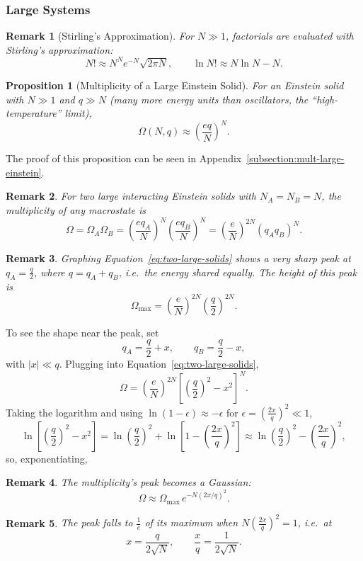 \documentclass{article}
\newtheorem{remark}{Remark}
\newtheorem{proposition}{Proposition}
\begin{document}
\subsubsection{Large Systems}
\begin{remark}[Stirling's Approximation]
    For $N \gg 1$, factorials are evaluated with Stirling's approximation:
    \begin{equation}
        \label{eq:stirling-approx}
        N! \approx N^N e^{-N}\sqrt{2\pi N}, \qquad \ln N! \approx N\ln N - N.
    \end{equation}
\end{remark}
\begin{proposition}[Multiplicity of a Large Einstein Solid]
    For an Einstein solid with $N \gg 1$ and $q \gg N$ (many more energy units than oscillators, the ``high-temperature'' limit),
    \begin{equation}
        \label{eq:einstein-high-T}
        \Omega(N, q) \approx \left(\frac{eq}{N}\right)^N.
    \end{equation}
\end{proposition}
The proof of this proposition can be seen in Appendix~\ref{subsection:mult-large-einstein}.
\begin{remark}
    For two large interacting Einstein solids with $N_A = N_B = N$, the multiplicity of any macrostate is
    \begin{equation}
        \label{eq:two-large-solids}
        \Omega = \Omega_A\Omega_B = \left(\frac{eq_A}{N}\right)^N\left(\frac{eq_B}{N}\right)^N = \left(\frac{e}{N}\right)^{2N}(q_A q_B)^N.
    \end{equation}
\end{remark}
\begin{remark}
    Graphing Equation~\eqref{eq:two-large-solids} shows a very sharp peak at $q_A = \frac{q}{2}$, where $q = q_A + q_B$, i.e.\ the energy shared equally. The height of this peak is
    \[\Omega_{\max} = \left(\frac{e}{N}\right)^{2N}\left(\frac{q}{2}\right)^{2N}.\]
\end{remark}
To see the shape near the peak, set
\[q_A = \frac{q}{2} + x, \qquad q_B = \frac{q}{2} - x,\]
with $|x| \ll q$. Plugging into Equation~\eqref{eq:two-large-solids},
\[\Omega = \left(\frac{e}{N}\right)^{2N}\left[\left(\frac{q}{2}\right)^2 - x^2\right]^N.\]
Taking the logarithm and using $\ln(1 - \epsilon) \approx -\epsilon$ for $\epsilon = \left(\frac{2x}{q}\right)^2 \ll 1$,
\[\ln\left[\left(\frac{q}{2}\right)^2 - x^2\right] = \ln\left(\frac{q}{2}\right)^2 + \ln\left[1 - \left(\frac{2x}{q}\right)^2\right] \approx \ln\left(\frac{q}{2}\right)^2 - \left(\frac{2x}{q}\right)^2,\]
so, exponentiating,
\begin{remark}
    The multiplicity's peak becomes a Gaussian:
    \[\Omega \approx \Omega_{\max}\,e^{-N(2x/q)^2}.\]
\end{remark}
\begin{remark}
     The peak falls to $\frac{1}{e}$ of its maximum when $N\left(\frac{2x}{q}\right)^2 = 1$, i.e.\ at
    \[x = \frac{q}{2\sqrt{N}}, \qquad \frac{x}{q} = \frac{1}{2\sqrt{N}}.\]
\end{remark}
\end{document}
